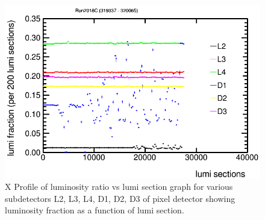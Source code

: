 \begin{figure}[H]
  \centering
  \includegraphics[width=0.5\columnwidth]{./ProfileXcombinedC_new.png}
  \caption{X Profile of luminosity ratio vs lumi section graph for various subdetectors L2, L3, L4, D1, D2, D3 of pixel detector showing luminosity fraction as a function of lumi section.}
  \label{fig:CMS}
\end{figure}

